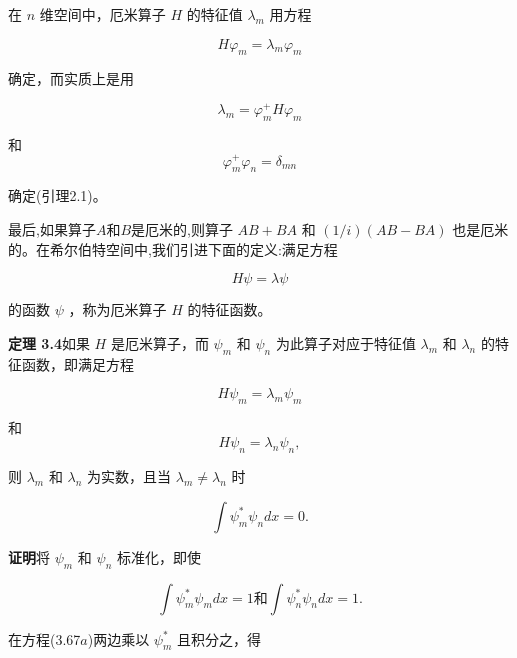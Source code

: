 在 $n$ 维空间中，厄米算子 $H$ 的特征值 $\lambda_{m}$ 用方程

\begin{equation*}
H \varphi_ {m} = \lambda_ {m} \varphi_ {m}
\end{equation*}

确定，而实质上是用

\begin{equation*}
\lambda_ {m} = \varphi_ {m} ^ {+} H \varphi_ {m}
\end{equation*}

和
\begin{equation*}
\varphi_ {m} ^ {+} \varphi_ {n} = \delta_ {m n}
\end{equation*}

确定(引理2.1)。

最后,如果算子$A$和$B$是厄米的,则算子 $AB + BA$ 和 $(1/i)(AB - BA)$ 也是厄米的。在希尔伯特空间中,我们引进下面的定义:满足方程

\begin{equation*}
H \psi = \lambda \psi\tag{3.66}
\end{equation*}

的函数 $\psi$ ，称为厄米算子 $H$ 的特征函数。

\textbf{定理 3.4}\quad 如果 $H$ 是厄米算子，而 $\psi_{m}$ 和 $\psi_{n}$ 为此算子对应于特征值 $\lambda_{m}$ 和 $\lambda_{n}$ 的特征函数，即满足方程

\begin{equation*}
H \psi_ {m} = \lambda_ {m} \psi_ {m}\tag{3.67a}
\end{equation*}

和
\begin{equation*}
H \psi_ {n} = \lambda_ {n} \psi_ {n},\tag{3.67b}
\end{equation*}

则 $\lambda_{m}$ 和 $\lambda_{n}$ 为实数，且当 $\lambda_{m} \neq \lambda_{n}$ 时

\begin{equation*}
\int \psi_ {m} ^ {*} \psi_ {n} d x = 0.\tag{3.68}
\end{equation*}

\textbf{证明}\quad 将 $\psi_{m}$ 和 $\psi_{n}$ 标准化，即使

\begin{equation*}
\int \psi_ {m} ^ {*} \psi_ {m} d x = 1 \text {和} \int \psi_ {n} ^ {*} \psi_ {n} d x = 1.
\end{equation*}

在方程(3.67$a$)两边乘以 $\psi_{m}^{*}$ 且积分之，得


